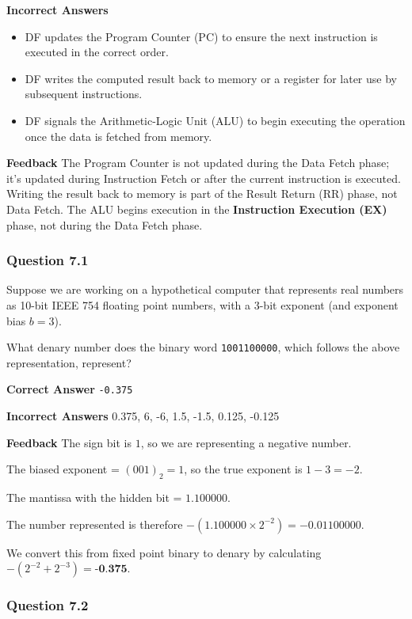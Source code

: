 \textbf{Incorrect Answers}
\begin{itemize}
    \item DF updates the Program Counter (PC) to ensure the next instruction is executed in the correct order.
    \item DF writes the computed result back to memory or a register for later use by subsequent instructions.
    \item DF signals the Arithmetic-Logic Unit (ALU) to begin executing the operation once the data is fetched from memory.
\end{itemize}

\textbf{Feedback}
The Program Counter is not updated during the Data Fetch phase; it’s updated during Instruction Fetch or after the current instruction is executed. Writing the result back to memory is part of the Result Return (RR) phase, not Data Fetch. The ALU begins execution in the \textbf{Instruction Execution (EX)} phase, not during the Data Fetch phase.

\vspace{1.5em}

\subsubsection{Question 7.1}

Suppose we are working on a hypothetical computer that represents real numbers as 10-bit IEEE 754 floating point numbers, with a 3-bit exponent (and exponent bias $b = 3$).

What denary number does the binary word \texttt{1001100000}, which follows the above representation, represent?

\textbf{Correct Answer}
\texttt{-0.375}

\textbf{Incorrect Answers}
0.375, 6, -6, 1.5, -1.5, 0.125, -0.125

\textbf{Feedback}
The sign bit is $1$, so we are representing a negative number.

The biased exponent = $(001)_2 = 1$, so the true exponent is $1 - 3 = -2$.

The mantissa with the hidden bit = $1.100000$.

The number represented is therefore $-(1.100000 \times 2^{-2}) = -0.01100000$.

We convert this from fixed point binary to denary by calculating $-(2^{-2} + 2^{-3}) = \textbf{-0.375}$.

\subsubsection{Question 7.2}

